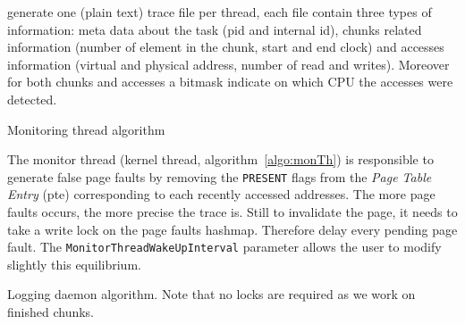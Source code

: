 \Moca generate one (plain text) trace file per thread, each file contain three
types of information: meta data about the task (pid and \Moca internal id),
chunks related information (number of element in the chunk, start and end
clock) and accesses information (virtual and physical address, number of read
and writes). Moreover for both chunks and accesses a bitmask indicate on which
CPU the accesses were detected.

\begin{algorithm}[htb]
    \caption{Monitoring thread algorithm}
    \label{algo:monTh}
    \begin{algorithmic}[1]
        \State {}
                    \State {}
                    \State {}
                    \State {}
                \EndFor
            \EndFor
            \State {}
        \EndWhile
    \end{algorithmic}
\end{algorithm}

The monitor thread (kernel thread, algorithm~\ref{algo:monTh}) is
responsible to generate false page faults by removing the \texttt{PRESENT}
flags from the \emph{Page Table Entry} (pte) corresponding to each recently
accessed addresses. The more page faults occurs, the more
precise the trace is. Still to invalidate the page, it needs
to take a write lock on the page faults hashmap. Therefore
delay every pending page fault. The
\texttt{MonitorThreadWakeUpInterval} parameter allows the user
to modify slightly this equilibrium.

\begin{algorithm}[htb]
    \caption{Logging daemon algorithm. Note that no locks are required as we
    work on finished chunks.}
    \label{algo:flushTh}
    \begin{algorithmic}[1]
                \State {}
                \State {}
                \EndFor
            \EndFor
            \State {}
        \EndWhile
    \end{algorithmic}
\end{algorithm}

